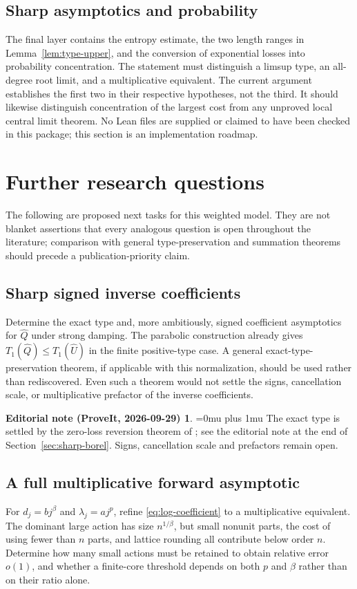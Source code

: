 \documentclass[11pt,a4paper]{article}
\numberwithin{equation}{section}
\theoremstyle{definition}
\theoremstyle{remark}
\theoremstyle{definition}
\newtheorem*{ednoteinner}{Editorial note (ProveIt, 2026-09-29)}
\newenvironment{ednote}{\begin{ednoteinner}\sloppy\Urlmuskip=0mu plus 1mu\relax}{\end{ednoteinner}}
\newcommand{\U}{\widehat U}
\newcommand{\Q}{\widehat Q}
\begin{document}
\subsection{Sharp asymptotics and probability}
The final layer contains the entropy estimate, the two length ranges in
Lemma~\ref{lem:type-upper}, and the conversion of exponential losses
into probability concentration. The statement must distinguish a limsup
type, an all-degree root limit, and a multiplicative equivalent.
The current argument establishes the first two in their respective
hypotheses, not the third. It should likewise distinguish concentration
of the largest cost from any unproved local central limit theorem.
No Lean files are supplied or claimed to have been checked in this
package; this section is an implementation roadmap.

\section{Further research questions}
\label{sec:research}

The following are proposed next tasks for this weighted model. They are
not blanket assertions that every analogous question is open throughout
the literature; comparison with general type-preservation and summation
theorems should precede a publication-priority claim.

\subsection{Sharp signed inverse coefficients}
Determine the exact type and, more ambitiously, signed coefficient
asymptotics for $\Q$ under strong damping. The parabolic construction
already gives $T_1(\Q)\le T_1(\U)$ in the finite positive-type case.
A general exact-type-preservation theorem, if applicable with this
normalization, should be used rather than rediscovered. Even such a
theorem would not settle the signs, cancellation scale, or multiplicative
prefactor of the inverse coefficients.
\begin{ednote}
The exact type is settled by the zero-loss reversion theorem of
\cite{ed:swt}; see the editorial note at the end of
Section~\ref{sec:sharp-borel}. Signs, cancellation scale and prefactors
remain open.
\end{ednote}

\subsection{A full multiplicative forward asymptotic}
For $d_j=bj^\beta$ and $\lambda_j=aj^p$, refine
\eqref{eq:log-coefficient} to a multiplicative equivalent. The dominant
large action has size $n^{1/\beta}$, but small nonunit parts, the cost of
using fewer than $n$ parts, and lattice rounding all contribute below
order $n$. Determine how many small actions must be retained to obtain
relative error $o(1)$, and whether a finite-core threshold depends on
both $p$ and $\beta$ rather than on their ratio alone.
\end{document}
